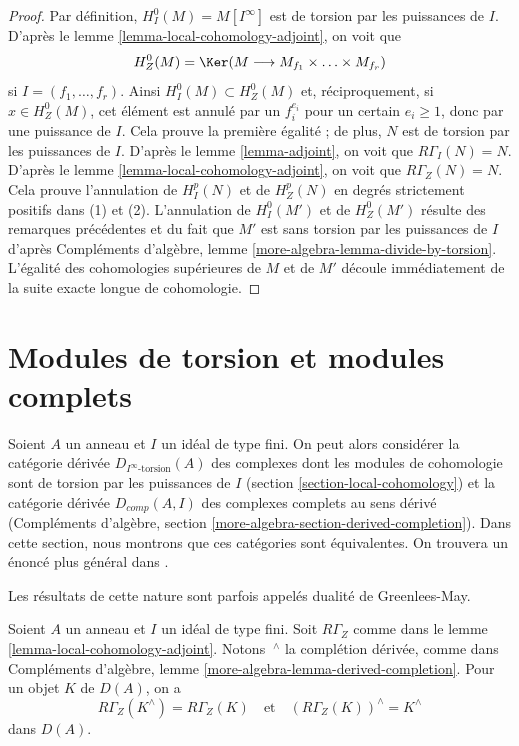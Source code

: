 \begin{proof}
Par définition, $H^0_I(M) = M[I^\infty]$ est de torsion par les puissances de $I$.
D'après le lemme \ref{lemma-local-cohomology-adjoint}, on voit que
$$
H^0_Z(M) = \Ker(M \longrightarrow M_{f_1} \times \ldots \times M_{f_r})
$$
si $I = (f_1, \ldots, f_r)$. Ainsi $H^0_I(M) \subset H^0_Z(M)$ et, réciproquement, si $x \in H^0_Z(M)$,
cet élément est annulé par un $f_i^{e_i}$ pour un certain $e_i \geq 1$,
donc par une puissance de $I$.
Cela prouve la première égalité ; de plus, $N$ est de torsion
par les puissances de $I$.
D'après le lemme \ref{lemma-adjoint}, on voit que $R\Gamma_I(N) = N$.
D'après le lemme \ref{lemma-local-cohomology-adjoint}, on voit que $R\Gamma_Z(N) = N$.
Cela prouve l'annulation de $H^p_I(N)$ et de $H^p_Z(N)$ en degrés strictement
positifs dans (1) et (2).
L'annulation de $H^0_I(M')$ et de $H^0_Z(M')$ résulte des remarques précédentes
et du fait que $M'$ est sans torsion par les puissances de $I$
d'après Compléments d'algèbre, lemme \ref{more-algebra-lemma-divide-by-torsion}.
L'égalité des cohomologies supérieures de $M$ et de $M'$
découle immédiatement de la suite exacte longue de cohomologie.
\end{proof}









\section{Modules de torsion et modules complets}
\label{section-torsion-and-complete}

\noindent
Soient $A$ un anneau et $I$ un idéal de type fini.
On peut alors considérer la catégorie dérivée $D_{I^\infty\text{-torsion}}(A)$
des complexes dont les modules de cohomologie sont de torsion
par les puissances de $I$ (section \ref{section-local-cohomology})
et la catégorie dérivée $D_{comp}(A, I)$ des complexes complets au sens dérivé
(Compléments d'algèbre, section \ref{more-algebra-section-derived-completion}).
Dans cette section, nous montrons que ces catégories sont équivalentes.
On trouvera un énoncé plus général dans \cite{Dwyer-Greenlees}.

\begin{lemma}
\label{lemma-complete-and-local}
\begin{slogan}
Les résultats de cette nature sont parfois appelés dualité de Greenlees-May.
\end{slogan}
Soient $A$ un anneau et $I$ un idéal de type fini.
Soit $R\Gamma_Z$ comme dans le lemme \ref{lemma-local-cohomology-adjoint}.
Notons ${\ }^\wedge$ la complétion dérivée, comme dans
Compléments d'algèbre, lemme \ref{more-algebra-lemma-derived-completion}.
Pour un objet $K$ de $D(A)$, on a
$$
R\Gamma_Z(K^\wedge) = R\Gamma_Z(K)
\quad\text{et}\quad
(R\Gamma_Z(K))^\wedge = K^\wedge
$$
dans $D(A)$.
\end{lemma}

